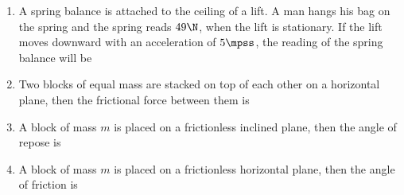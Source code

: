 \documentclass{article}
\def\ansit#1{\textcolor{red!95}{\quad [ #1 ]}}
\begin{document}
\begin{enumerate}
\item A spring balance is attached to the ceiling of a lift. A man hangs his bag on the spring and the spring reads $49 \N$, when the lift is stationary. If the lift moves downward with an acceleration of $5 \mpss$, the reading of the spring balance will be \ansit{24}

\item Two blocks of equal mass are stacked on top of each other on a horizontal plane, then the frictional force between them is \ansit{0}

\item A block of mass $m$ is placed on a frictionless inclined plane, then the angle of repose is \ansit{0}

\item A block of mass $m$ is placed on a frictionless horizontal plane, then the angle of friction is \ansit{0}
	
\end{enumerate}
\end{document}
